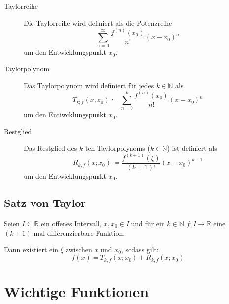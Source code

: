 			\begin{description}
				\item[Taylorreihe] Die Taylorreihe wird definiert als die Potenzreihe \[ \sum _ { n = 0 } ^ \infty \frac{f ^ {(n)} (x _ 0)}{n!} (x - x _ 0) ^ n \] um den Entwicklungspunkt $ x _ 0 $.
				\item[Taylorpolynom] Das Taylorpolynom wird definiert für jedes $ k \in \mathbb{N} $ als \[ T _ { k; f } (x, x _ 0) \coloneqq \sum _ { n = 0 } ^ k \frac{f ^ {(n)} (x _ 0)}{n!} (x - x _ 0) ^ n \] um den Entiwcklungspunkt $ x _ 0 $.
				\item[Restglied] Das Restglied des $ k\text{-ten} $ Taylorpolynoms ($ k \in \mathbb{N} $) ist definiert als \[ R _ { k, f } (x; x _ 0) \coloneqq \frac{f ^ {(k + 1)} (\xi)}{(k + 1)!} (x - x _ 0) ^ { k + 1 } \] um den Entwicklungspunkt $ x _ 0 $.
			\end{description}

		\subsection{Satz von Taylor}
			Seien $ I \subseteq \mathbb{R} $ ein offenes Intervall, $ x, x _ 0 \in I $ und für ein $ k \in \mathbb{N} $ $ f : I \rightarrow \mathbb{R} $ eine $ (k + 1)\text{-mal} $ differenzierbare Funktion.

			Dann existiert ein $ \xi $ zwischen $ x $ und $ x _ 0 $, sodass gilt:
			\begin{equation*}
				f(x) = T _ { k, f } (x; x _ 0) + R _ { k, f } (x; x _ 0)
			\end{equation*}

	\section{Wichtige Funktionen}
		\label{sec:wichtigefunktionen}


